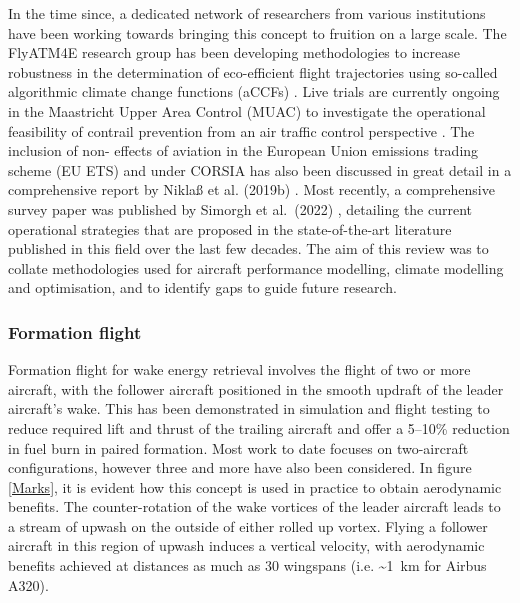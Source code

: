 In the time since, a dedicated network of researchers from various institutions have been working towards bringing this concept to fruition on a large scale. The FlyATM4E research group has been developing methodologies to increase robustness in the determination of eco-efficient flight trajectories using so-called algorithmic climate change functions (aCCFs) \cite{Matthes2020}. Live trials are currently ongoing in the Maastricht Upper Area Control (MUAC) to investigate the operational feasibility of contrail prevention from an air traffic control perspective \cite{MUAC2021}. The inclusion of non- effects of aviation in the European Union emissions trading scheme (EU ETS) and under CORSIA has also been discussed in great detail in a comprehensive report by Nikla{\ss} et al. (2019b) \cite{Niklass2019b}. Most recently, a comprehensive survey paper was published by Simorgh et al.\ (2022) \cite{Simorgh2022}, detailing the current operational strategies that are proposed in the state-of-the-art literature published in this field over the last few decades. The aim of this review was to collate methodologies used for aircraft performance modelling, climate modelling and optimisation, and to identify gaps to guide future research.




\subsubsection{Formation flight}
\label{Formation_flight}
Formation flight for wake energy retrieval involves the flight of two or more aircraft, with the follower aircraft positioned in the smooth updraft of the leader aircraft’s wake. This has been demonstrated in simulation \cite{Venkataramanan2003, Bangash2004} and flight testing \cite{Hanson2002} to reduce required lift and thrust of the trailing aircraft and offer a 5--10\% reduction in fuel burn in paired formation. Most work to date focuses on two-aircraft configurations, however three \cite{Bower2009} and more have also been considered. In figure \ref{Marks}, it is evident how this concept is used in practice to obtain aerodynamic benefits. The counter-rotation of the wake vortices of the leader aircraft leads to a stream of upwash on the outside of either rolled up vortex. Flying a follower aircraft in this region of upwash induces a vertical velocity, with aerodynamic benefits achieved at distances as much as 30 wingspans (i.e. \textasciitilde1~km for Airbus A320).

